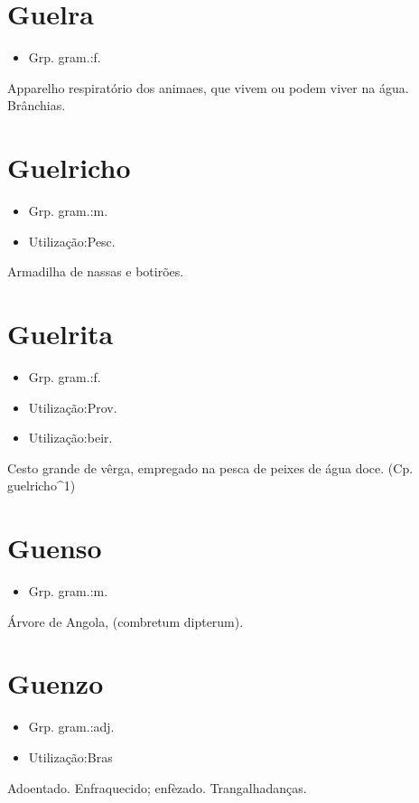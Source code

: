 \section{Guelra}
\begin{itemize}
\item {Grp. gram.:f.}
\end{itemize}
Apparelho respiratório dos animaes, que vivem ou podem viver na água.
Brânchias.
\section{Guelricho}
\begin{itemize}
\item {Grp. gram.:m.}
\end{itemize}
\begin{itemize}
\item {Utilização:Pesc.}
\end{itemize}
Armadilha de nassas e botirões.
\section{Guelrita}
\begin{itemize}
\item {Grp. gram.:f.}
\end{itemize}
\begin{itemize}
\item {Utilização:Prov.}
\end{itemize}
\begin{itemize}
\item {Utilização:beir.}
\end{itemize}
Cesto grande de vêrga, empregado na pesca de peixes de água doce.
(Cp. \textunderscore guelricho\textunderscore ^1)
\section{Guenso}
\begin{itemize}
\item {Grp. gram.:m.}
\end{itemize}
Árvore de Angola, (\textunderscore combretum dipterum\textunderscore ).
\section{Guenzo}
\begin{itemize}
\item {Grp. gram.:adj.}
\end{itemize}
\begin{itemize}
\item {Utilização:Bras}
\end{itemize}
Adoentado.
Enfraquecido; enfèzado.
Trangalhadanças.
